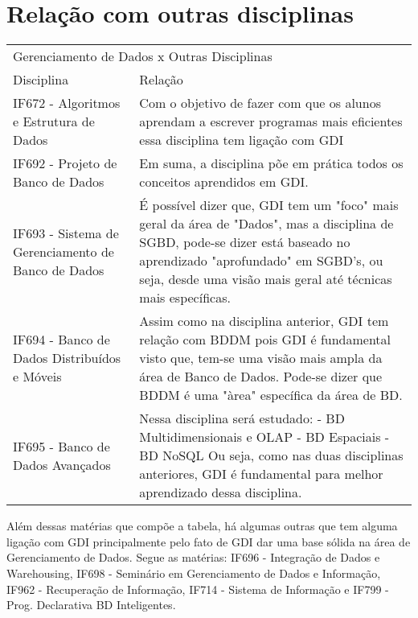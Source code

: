 \documentclass{article}
\begin{document}
\section{Relação com outras disciplinas}

\begin{table}[h]
 \centering
 {\renewcommand\arraystretch{1.25}
 \begin{tabular}{ l l }
  \cline{1-1}\cline{2-2}  
    \multicolumn{2}{|p{12cm}|}{Gerenciamento de Dados x Outras Disciplinas \centering }
  \\ 
  \cline{1-1}\cline{2-2}  
    \multicolumn{1}{|p{5cm}|}{Disciplina \centering } &
    \multicolumn{1}{p{7cm}|}{Relação \centering }
  \\ 
  \cline{1-1}\cline{2-2}  
    \multicolumn{1}{|p{5cm}|}{IF672 - Algoritmos e Estrutura de Dados \centering } &
    \multicolumn{1}{p{7cm}|}{Com o objetivo de fazer com que os alunos aprendam a escrever programas mais eficientes essa disciplina tem ligação com GDI}
  \\ 
  \cline{1-1}\cline{2-2}  
    \multicolumn{1}{|p{5cm}|}{IF692 - Projeto de Banco de Dados \centering } &
    \multicolumn{1}{p{7cm}|}{Em suma, a disciplina põe em prática todos os conceitos aprendidos em GDI.}
  \\ 
  \cline{1-1}\cline{2-2}  
    \multicolumn{1}{|p{5cm}|}{IF693 -  Sistema de Gerenciamento de Banco de Dados \centering } &
    \multicolumn{1}{p{7cm}|}{É possível dizer que, GDI tem um "foco" mais geral da área de "Dados", mas a disciplina de SGBD, pode-se dizer está baseado no aprendizado "aprofundado" em SGBD's, ou seja, desde uma visão mais geral até técnicas mais específicas.}
  \\ 
  \cline{1-1}\cline{2-2}  
    \multicolumn{1}{|p{5cm}|}{IF694 - Banco de Dados Distribuídos e Móveis \centering } &
    \multicolumn{1}{p{7cm}|}{Assim como na disciplina anterior, GDI tem relação com BDDM pois GDI é fundamental visto que, tem-se uma visão mais ampla da área de Banco de Dados. Pode-se dizer que BDDM é uma "àrea" específica da área de BD. }
  \\
  \cline{1-1}\cline{2-2}  
    \multicolumn{1}{|p{5cm}|}{IF695 - Banco de Dados Avançados \centering } &
    \multicolumn{1}{p{7cm}|}{Nessa disciplina será estudado: 
- BD Multidimensionais e OLAP
- BD Espaciais  			
- BD NoSQL  			
Ou seja, como nas duas disciplinas anteriores, GDI é fundamental para melhor aprendizado dessa disciplina.}
  \\ 
  \hline
\end{tabular}}
\end{table}

Além dessas matérias que compõe a tabela, há algumas outras que tem alguma ligação com GDI principalmente pelo fato de GDI dar uma base sólida na área de Gerenciamento de Dados. Segue as matérias: IF696 - Integração de Dados e Warehousing, IF698 - Seminário em Gerenciamento de Dados e Informação, IF962 - Recuperação de Informação, IF714 - Sistema de Informação e IF799 - Prog. Declarativa BD Inteligentes.



\end{document}
